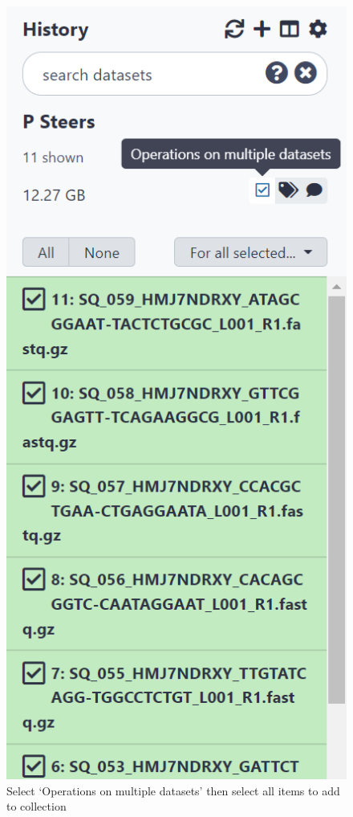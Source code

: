\documentclass[
]{book}
\begin{document}
\begin{figure}

{\centering \includegraphics[width=5.94in]{images/image005} 

}

\caption{Select ‘Operations on multiple datasets’ then select all items to add to collection}\label{fig:chunk5}
\end{figure}
\end{document}

